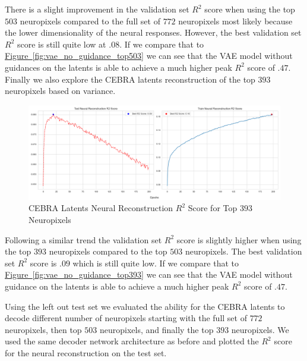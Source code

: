 \documentclass[12pt, letterpaper]{article}
\begin{document}
There is a slight improvement in the validation set $R^2$ score when using the top $503$ neuropixels compared to the full set of $772$ neuropixels most likely because the lower dimensionality of the neural responses. However, the best validation set $R^2$ score is still quite low at $.08$. If we compare that to \hyperref[fig:vae_no_guidance_top503]{Figure~\ref{fig:vae_no_guidance_top503}} we can see that the VAE model without guidances on the latents is able to achieve a much higher peak $R^2$ score of $.47$. Finally we also explore the CEBRA \cite{schneider2023} latents reconstruction of the top $393$ neuropixels based on variance.

\begin{figure}[H]
    \centering
    \includegraphics[width=1.0\textwidth]{cebra_x_r2_393_200_epochs_3_layer.png}
    \caption{CEBRA Latents Neural Reconstruction $R^2$ Score for Top $393$ Neuropixels}
    \label{fig:cebra_latents_neural_reconstruction_393}
\end{figure}

Following a similar trend the validation set $R^2$ score is slightly higher when using the top $393$ neuropixels compared to the top $503$ neuropixels. The best validation set $R^2$ score is $.09$ which is still quite low. If we compare that to \hyperref[fig:vae_no_guidance_top393]{Figure~\ref{fig:vae_no_guidance_top393}} we can see that the VAE model without guidance on the latents is able to achieve a much higher peak $R^2$ score of $.47$.

Using the left out test set we evaluated the ability for the CEBRA latents to decode different number of neuropixels starting with the full set of $772$ neuropixels, then top $503$ neuropixels, and finally the top $393$ neuropixels. We used the same decoder network architecture as before and plotted the $R^2$ score for the neural reconstruction on the test set.
\end{document}
